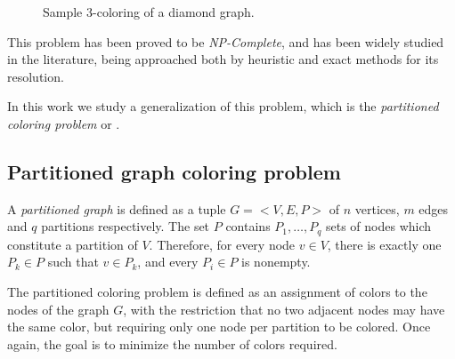\begin{figure}[h]
	\centering
\caption{Sample 3-coloring of a diamond graph.}
	\label{fig:samplecoloring}
\end{figure}

This problem has been proved to be \textit{NP-Complete}, and has been widely studied in the literature, being approached both by heuristic and exact methods for its resolution.

In this work we study a generalization of this problem, which is the \textit{partitioned coloring problem} or \PCP{}.

\subsection{Partitioned graph coloring problem}

A \textit{partitioned graph} is defined as a tuple $G = <V,E,P>$ of $n$ vertices, $m$ edges and $q$ partitions respectively. The set $P$ contains $P_1, \ldots ,P_q$ sets of nodes which constitute a partition of $V$. Therefore, for every node $v \in V$, there is exactly one $P_k \in P$ such that $v \in P_k$, and every $P_i \in P$ is nonempty.

The partitioned coloring problem is defined as an assignment of colors to the nodes of the graph $G$, with the restriction that no two adjacent nodes may have the same color, but requiring only one node per partition to be colored. Once again, the goal is to minimize the number of colors required.

